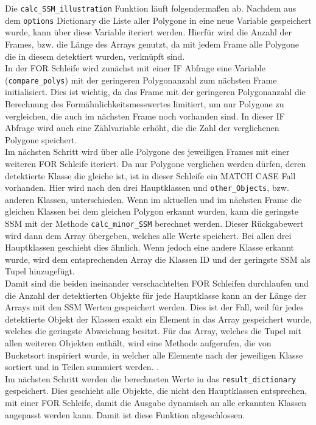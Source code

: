 {	Die \lstinline|calc_SSM_illustration| Funktion läuft folgendermaßen ab. Nachdem aus dem \lstinline|options| Dictionary die Liste aller Polygone in eine neue Variable gespeichert wurde, kann über diese Variable iteriert werden. Hierfür wird die Anzahl der Frames, bzw. die Länge des Arrays genutzt, da mit jedem Frame alle Polygone die in diesem detektiert wurden, verknüpft sind. \\
	In der FOR Schleife wird zunächst mit einer IF Abfrage eine Variable (\lstinline|compare_polys|) mit der geringeren Polygonanzahl zum nächsten Frame initialisiert. Dies ist wichtig, da das Frame mit der geringeren Polygonanzahl die Berechnung des Formähnlichkeitsmesswertes limitiert, um nur Polygone zu vergleichen, die auch im nächsten Frame noch vorhanden sind. In dieser IF Abfrage wird auch eine Zählvariable erhöht, die die Zahl der verglichenen Polygone speichert. \\
	Im nächsten Schritt wird über alle Polygone des jeweiligen Frames mit einer weiteren FOR Schleife iteriert. Da nur Polygone verglichen werden dürfen, deren detektierte Klasse die gleiche ist, ist in dieser Schleife ein MATCH CASE Fall vorhanden. Hier wird nach den drei Hauptklassen und \lstinline|other_Objects|, bzw. anderen Klassen, unterschieden. Wenn im aktuellen und im nächsten Frame die gleichen Klassen bei dem gleichen Polygon erkannt wurden, kann die geringste SSM mit der Methode \lstinline|calc_minor_SSM| berechnet werden. Dieser Rückgabewert wird dann dem Array übergeben, welches alle Werte speichert. Bei allen drei Hauptklassen geschieht dies ähnlich. Wenn jedoch eine andere Klasse erkannt wurde, wird dem entsprechenden Array die Klassen ID und der geringste SSM als Tupel hinzugefügt. \\
	Damit sind die beiden ineinander verschachtelten FOR Schleifen durchlaufen und die Anzahl der detektierten Objekte für jede Hauptklasse kann an der Länge der Arrays mit den SSM Werten gespeichert werden. Dies ist der Fall, weil für jedes detektierte Objekt der Klassen exakt ein Element in das Array gespeichert wurde, welches die geringste Abweichung besitzt. Für das Array, welches die Tupel mit allen weiteren Objekten enthält, wird eine Methode aufgerufen, die von Bucketsort inspiriert wurde, in welcher alle Elemente nach der jeweiligen Klasse sortiert und in Teilen summiert werden. . \\
	Im nächsten Schritt werden die berechneten Werte in das \lstinline|result_dictionary| gespeichert. Dies geschieht alle Objekte, die nicht den Hauptklassen entsprechen, mit einer FOR Schleife, damit die Ausgabe dynamisch an alle erkannten Klassen angepasst werden kann. Damit ist diese Funktion abgeschlossen. \\

}
